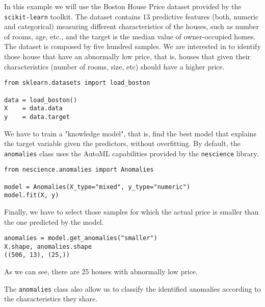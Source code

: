 \begin{example}
\label{ex-abnormal_boston_houses}
In this example we will use the Boston House Price dataset provided by the \texttt{scikit-learn} toolkit. The dataset contains 13 predictive features (both, numeric and categorical) measuring different characteristics of the houses, such as number of rooms, age, etc., and the target is the median value of owner-occupied homes. The dataset is composed by five hundred samples. We are interested in to identify those house that have an abnormally low price, that is, houses that given their characteristics (number of rooms, size, etc) should have a higher price.

\begin{sourcecode}
{\scriptsize \begin{verbatim}
from sklearn.datasets import load_boston

data = load_boston()
X    = data.data
y    = data.target
\end{verbatim}}
\end{sourcecode}

We have to train a "knowledge model", that is, find the best model that explains the target variable given the predictors, without overfitting. By default, the \texttt{anomalies} class uses the AutoML capabilities provided by the \texttt{nescience} library.

\begin{sourcecode}
{\scriptsize \begin{verbatim}
from nescience.anomalies import Anomalies

model = Anomalies(X_type="mixed", y_type="numeric")
model.fit(X, y)
\end{verbatim}}
\end{sourcecode}

Finally, we have to select those samples for which the actual price is smaller than the one predicted by the model.

\begin{sourcecode}
{\scriptsize \begin{verbatim}
anomalies = model.get_anomalies("smaller")
X.shape, anomalies.shape
((506, 13), (25,))
\end{verbatim}}
\end{sourcecode}

As we can see, there are 25 houses with abnormally low price.
\end{example}

The \texttt{anomalies} class also allow us to classify the identified anomalies according to the characteristics they share.


